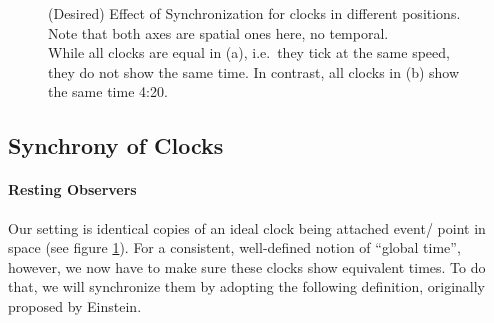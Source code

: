 \begin{figure}
	\centering
	
	\hspace*{0.1\textwidth}
	
	\caption[Effect of Synchronization]{(Desired) Effect of Synchronization for clocks in different positions. Note that both axes are spatial ones here, no temporal.\\
	While all clocks are equal in (a), i.e.~they tick at the same speed, they do not show the same time. In contrast, all clocks in (b) show the same time 4:20.}
	\label{fig:unsynchr_synchr_clocks}
\end{figure}



		\subsection{Synchrony of Clocks}
			\paragraph{Resting Observers}
Our setting is identical copies of an ideal clock being attached event/ point in space (see figure \ref{fig:unsynchr_synchr_clocks}). For a consistent, well-defined notion of \enquote{global time}, however, we now have to make sure these clocks show equivalent times. To do that, we will synchronize them by adopting the following definition, originally proposed by Einstein.


